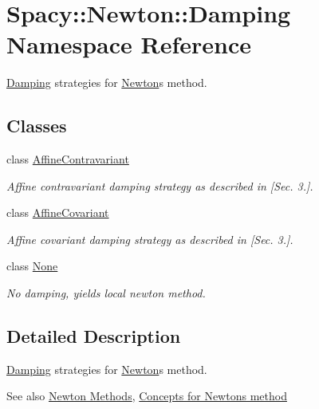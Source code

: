 \hypertarget{namespaceSpacy_1_1Newton_1_1Damping}{}\section{Spacy\+:\+:Newton\+:\+:Damping Namespace Reference}
\label{namespaceSpacy_1_1Newton_1_1Damping}


\hyperlink{namespaceSpacy_1_1Newton_1_1Damping}{Damping} strategies for \hyperlink{namespaceSpacy_1_1Newton}{Newton}\textquotesingle{}s method.  


\subsection*{Classes}
\begin{DoxyCompactItemize}
\item 
class \hyperlink{classSpacy_1_1Newton_1_1Damping_1_1AffineContravariant}{Affine\+Contravariant}
\begin{DoxyCompactList}\small\item\em Affine contravariant damping strategy as described in \cite{Deuflhard2004} \mbox{[}Sec. 3.\mbox{]}. \end{DoxyCompactList}\item 
class \hyperlink{classSpacy_1_1Newton_1_1Damping_1_1AffineCovariant}{Affine\+Covariant}
\begin{DoxyCompactList}\small\item\em Affine covariant damping strategy as described in \cite{Deuflhard2004} \mbox{[}Sec. 3.\mbox{]}. \end{DoxyCompactList}\item 
class \hyperlink{classSpacy_1_1Newton_1_1Damping_1_1None}{None}
\begin{DoxyCompactList}\small\item\em No damping, yields local newton method. \end{DoxyCompactList}\end{DoxyCompactItemize}


\subsection{Detailed Description}
\hyperlink{namespaceSpacy_1_1Newton_1_1Damping}{Damping} strategies for \hyperlink{namespaceSpacy_1_1Newton}{Newton}\textquotesingle{}s method. 

\begin{DoxySeeAlso}{See also}
\hyperlink{group__NewtonGroup}{Newton Methods}, \hyperlink{group__NewtonConceptGroup}{Concepts for Newton\textquotesingle{}s method} 
\end{DoxySeeAlso}
